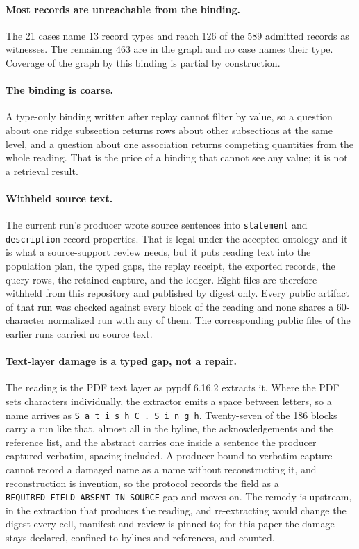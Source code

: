 \documentclass[10pt]{article}
\newcommand{\code}[1]{\texttt{#1}}
\begin{document}
\paragraph{Most records are unreachable from the binding.} The 21 cases name 13 record types and reach 126 of the 589 admitted records as witnesses. The remaining 463 are in the graph and no case names their type. Coverage of the graph by this binding is partial by construction.

\paragraph{The binding is coarse.} A type-only binding written after replay cannot filter by value, so a question about one ridge subsection returns rows about other subsections at the same level, and a question about one association returns competing quantities from the whole reading. That is the price of a binding that cannot see any value; it is not a retrieval result.

\paragraph{Withheld source text.} The current run's producer wrote source sentences into \code{statement} and \code{description} record properties. That is legal under the accepted ontology and it is what a source-support review needs, but it puts reading text into the population plan, the typed gaps, the replay receipt, the exported records, the query rows, the retained capture, and the ledger. Eight files are therefore withheld from this repository and published by digest only. Every public artifact of that run was checked against every block of the reading and none shares a 60-character normalized run with any of them. The corresponding public files of the earlier runs carried no source text.

\paragraph{Text-layer damage is a typed gap, not a repair.} The reading is the PDF text layer as pypdf 6.16.2 extracts it. Where the PDF sets characters individually, the extractor emits a space between letters, so a name arrives as \code{S a t i s h C . S i n g h}. Twenty-seven of the 186 blocks carry a run like that, almost all in the byline, the acknowledgements and the reference list, and the abstract carries one inside a sentence the producer captured verbatim, spacing included. A producer bound to verbatim capture cannot record a damaged name as a name without reconstructing it, and reconstruction is invention, so the protocol records the field as a \code{REQUIRED\_FIELD\_ABSENT\_IN\_SOURCE} gap and moves on. The remedy is upstream, in the extraction that produces the reading, and re-extracting would change the digest every cell, manifest and review is pinned to; for this paper the damage stays declared, confined to bylines and references, and counted.
\end{document}
